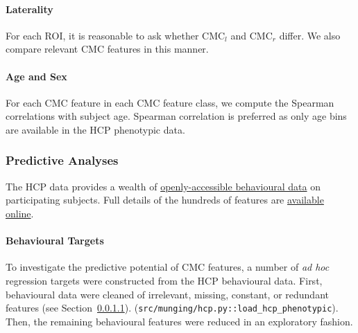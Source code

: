 \documentclass{article}
\begin{document}
%

\paragraph{Laterality} For each ROI, it is reasonable to ask whether
\(\text{CMC}_l\) and \(\text{CMC}_r\) differ. We also compare relevant CMC
features in this manner.

\paragraph{Age and Sex} For each CMC feature in each CMC feature class, we
compute the Spearman correlations with subject age. Spearman
correlation is preferred as only age bins are available in the HCP phenotypic
data.


\subsubsection{Predictive Analyses}

The HCP data provides a wealth of
\href{https://www.humanconnectome.org/study/hcp-young-adult/document/wu-minn-hcp-consortium-open-access-data-use-terms}{openly-accessible
behavioural data} on participating subjects. Full details of the hundreds of
features are
\href{https://wiki.humanconnectome.org/docs/HCP-YA%20Data%20Dictionary-%20Updated%20for%20the%201200%20Subject%20Release.html}{available
online}.

\paragraph{Behavioural Targets} \label{sec:cleaning}

%


To investigate the predictive potential of CMC features, a number of \emph{ad
hoc} regression targets were constructed from the HCP behavioural data.
First, behavioural data were cleaned of irrelevant, missing, constant, or
redundant features (see Section~\ref{sec:cleaning}).
(\texttt{src/munging/hcp.py::load\_hcp\_phenotypic}). Then, the remaining
behavioural features were reduced in an exploratory fashion.
\end{document}
